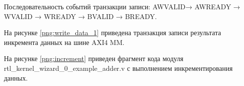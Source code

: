 Последовательность событий транзакции записи: AWVALID→ AWREADY → WVALID → WREADY → BVALID → BREADY.

На рисунке \ref{png:write_data_1} приведена транзакция записи результата инкремента данных на шине AXI4 MM.
\begin{figure}[H]
\end{figure}

На рисунке \ref{png:increment} приведен фрагмент кода модуля rtl\_kernel\_wizard\_0\_example\_adder.v с выполнением инкрементирования данных.
\begin{figure}[H]
\end{figure}